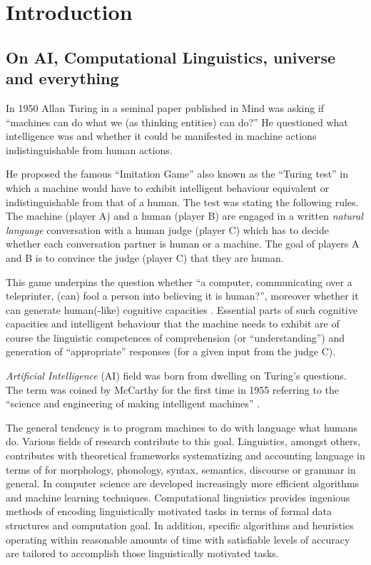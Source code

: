\chapter{Introduction}

\section{On AI, Computational Linguistics, universe and everything}
In 1950 Allan Turing in a seminal paper \citep{Turing1950} published in Mind was asking if ``machines can do what we (as thinking entities) can do?'' He questioned what intelligence was and whether it could be manifested in machine actions indistinguishable from human actions. 

He proposed the famous ``Imitation Game'' also known as the ``Turing test'' in which a machine would have to exhibit intelligent behaviour equivalent or indistinguishable from that of a human. The test was stating the following rules. The machine (player A) and a human (player B) are engaged in a written \textit{natural language} conversation with a human judge (player C) which has to decide whether each conversation partner is human or a machine. The goal of players A and B is to convince the judge (player C) that they are human. 

This game underpins the question whether ``a computer, communicating over a teleprinter, (can) fool a person into believing it is human?'', moreover whether it can generate human(-like) cognitive capacities \citep{Harnad1992}. Essential parts of such cognitive capacities and intelligent behaviour that the machine needs to exhibit are of course the linguistic competences of comprehension (or ``understanding'') and generation of ``appropriate'' responses (for a given input from the judge C).

\textit{Artificial Intelligence} (AI) field was born from dwelling on Turing's questions. The term was coined by McCarthy for the first time in 1955 referring to the ``science and engineering of making intelligent machines'' \citep{McCarthy1955}.

The general tendency is to program machines to do with language what humans do. Various fields of research contribute to this goal. Linguistics, amongst others, contributes with theoretical frameworks systematizing and accounting language in terms of for morphology, phonology, syntax, semantics, discourse or grammar in general. In computer science are developed increasingly more efficient algorithms and machine learning techniques. Computational linguistics provides ingenious methods of encoding linguistically motivated tasks in terms of formal data structures and computation goal. In addition, specific algorithms and heuristics operating within reasonable amounts of time with satisfiable levels of accuracy are tailored to accomplish those linguistically motivated tasks.

